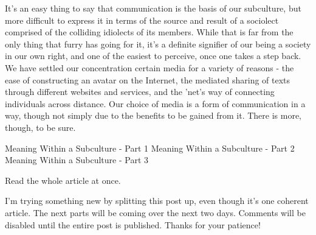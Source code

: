 It's an easy thing to say that communication is the basis of our subculture, but more difficult to express it in terms of the source and result of a sociolect comprised of the colliding idiolects of its members. While that is far from the only thing that furry has going for it, it's a definite signifier of our being a society in our own right, and one of the easiest to perceive, once one takes a step back. We have settled our concentration certain media for a variety of reasons - the ease of constructing an avatar on the Internet, the mediated sharing of texts through different websites and services, and the 'net's way of connecting individuals across distance. Our choice of media is a form of communication in a way, though not simply due to the benefits to be gained from it. There is more, though, to be sure.

Meaning Within a Subculture - Part 1 Meaning Within a Subculture - Part 2 Meaning Within a Subculture - Part 3

Read the whole article at once.

I'm trying something new by splitting this post up, even though it's one coherent article. The next parts will be coming over the next two days. Comments will be disabled until the entire post is published. Thanks for your patience!
